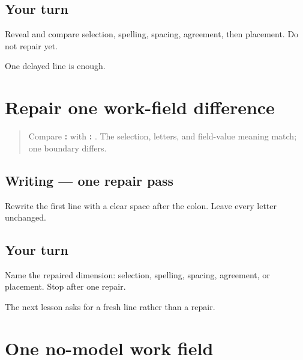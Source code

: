 \subsection*{Your turn}
Reveal and compare selection, spelling, spacing, agreement, then placement. Do not repair yet.

\begin{tcolorbox}[breakable,colback=teal!4,colframe=teal!35!black,title={Before you move on}]
One delayed line is enough.
\end{tcolorbox}
\section[\texorpdfstring{\pa{ਕੰਮ}: \pa{ਨੌਕਰੀ} (work field repair)}{ਕੰਮ: ਨੌਕਰੀ (work field repair)}]{Repair one work-field difference}

\label{lesson:PA-W05-work-repair}



\begin{quote}
Compare \textbf{:} with \textbf{: }. The selection, letters, and field-value meaning match; one boundary differs.
\end{quote}

\subsection*{Writing — one repair pass}
Rewrite the first line with a clear space after the colon. Leave every letter unchanged.

\subsection*{Your turn}
Name the repaired dimension: selection, spelling, spacing, agreement, or placement. Stop after one repair.

\begin{tcolorbox}[breakable,colback=teal!4,colframe=teal!35!black,title={Before you move on}]
The next lesson asks for a fresh line rather than a repair.
\end{tcolorbox}
\section[\texorpdfstring{\pa{ਕੰਮ}: \_\_\_\_\_\_\_\_\_\_ (work field)}{ਕੰਮ: \_\_\_\_\_\_\_\_\_\_ (work field)}]{One no-model work field}

\label{lesson:PA-W05-work-no-model}



